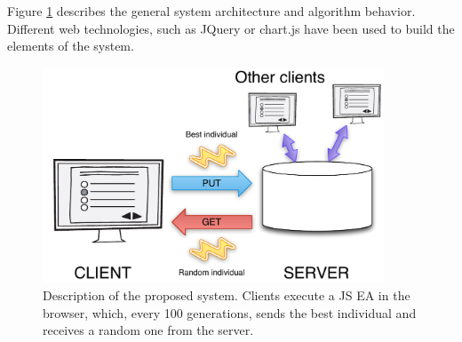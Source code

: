 \documentclass[journal,onecolumn]{IEEEtran}
\begin{document}
Figure \ref{fig:system} describes the general system architecture and
algorithm behavior. Different web technologies, such as JQuery or chart.js have
been used to build the elements of the system.
\begin{figure}[!t]
\centering
\includegraphics[width=4in]{img/system.pdf}
\caption{Description of the proposed system. Clients execute a JS EA
  in the browser, which, every 100 generations, sends the best
  individual and receives a random one from the server. }
\label{fig:system}
\end{figure}
\end{document}
